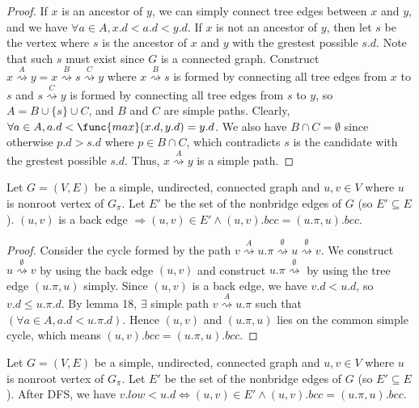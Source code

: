 \begin{proof}
    If $x$ is an ancestor of $y$,
    we can simply connect tree edges between $x$ and $y$,
    and we have $\forall a \in A, x.d < a.d < y.d$.
    If $x$ is not an ancestor of $y$,
    then let $s$ be the vertex where $s$ is the ancestor of $x$ and $y$
    with the grestest possible $s.d$.
    Note that such $s$ must exist since $G$ is a connected graph.
    Construct $x \overset{A}{\rightsquigarrow} y = 
    x \overset{B}{\rightsquigarrow} s \overset{C}{\rightsquigarrow} y$
    where $x \overset{B}{\rightsquigarrow} s$ is formed by connecting
    all tree edges from $x$ to $s$
    and $s \overset{C}{\rightsquigarrow} y$ is formed by connecting
    all tree edges from $s$ to $y$,
    so $A = B \cup \{ s \} \cup C$, and
    $B$ and $C$ are simple paths.
    Clearly, $\forall a \in A, a.d < \func{max}(x.d, y.d) = y.d$.
    We also have $B \cap C = \emptyset$
    since otherwise $p.d > s.d$ where $p \in B \cap C$,
    which contradicts $s$ is the candidate with the grestest possible $s.d$.
    Thus, $x \overset{A}{\rightsquigarrow} y$ is a simple path.
\end{proof}

\begin{lemma}
    Let $G = (V,E)$ be a simple, undirected, connected graph
    and $u,v \in V$ where $u$ is nonroot vertex of $G_\pi$.
    Let $E'$ be the set of the nonbridge edges of $G$ (so $E' \subseteq E$).
    $(u,v)$ is a back edge $\Longrightarrow 
    (u,v) \in E' \wedge (u,v).bcc = (u.\pi,u).bcc$.
\end{lemma}

\begin{proof}
    Consider the cycle formed by the path
    $v \overset{A}{\rightsquigarrow} u.\pi 
    \overset{\emptyset}{\rightsquigarrow} u 
    \overset{\emptyset}{\rightsquigarrow} v$.
    We construct $u \overset{\emptyset}{\rightsquigarrow} v$
    by using the back edge $(u,v)$
    and construct $u.\pi \overset{\emptyset}{\rightsquigarrow}$
    by using the tree edge $(u.\pi,u)$ simply.
    Since $(u,v)$ is a back edge,
    we have $v.d < u.d$,
    so $v.d \leq u.\pi.d$.
    By lemma 18, $\exists$ simple path
    $v \overset{A}{\rightsquigarrow} u.\pi$
    such that $(\forall a \in A, a.d < u.\pi.d)$.
    Hence $(u,v)$ and $(u.\pi,u)$ lies on the common simple cycle,
    which means $(u,v).bcc = (u.\pi,u).bcc$.
\end{proof}

\begin{claim}
    Let $G = (V,E)$ be a simple, undirected, connected graph
    and $u,v \in V$ where $u$ is nonroot vertex of $G_\pi$.
    Let $E'$ be the set of the nonbridge edges of $G$ (so $E' \subseteq E$).
    After DFS, we have
    $v.low < u.d \Longleftrightarrow 
    (u,v) \in E' \wedge (u,v).bcc = (u.\pi,u).bcc$.
\end{claim}

